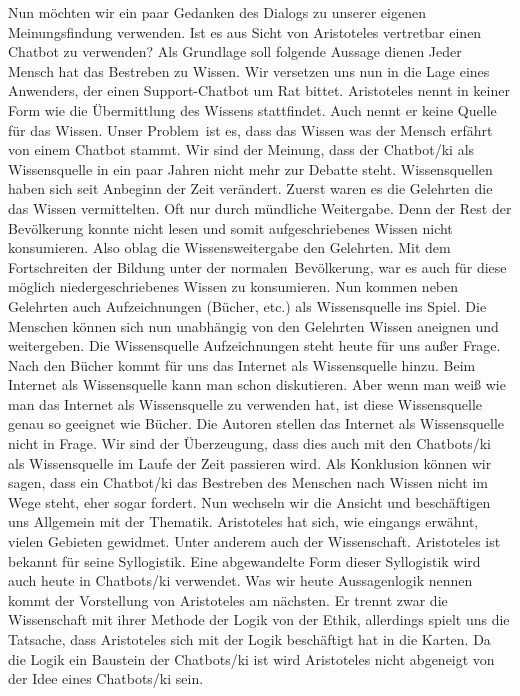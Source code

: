 Nun möchten wir ein paar Gedanken des Dialogs zu unserer eigenen Meinungsfindung verwenden. Ist es aus Sicht von Aristoteles vertretbar einen Chatbot zu verwenden? Als Grundlage soll folgende Aussage dienen \glqq Jeder Mensch hat das Bestreben zu Wissen\grqq. Wir versetzen uns nun in die Lage eines Anwenders, der einen Support-Chatbot um Rat bittet. Aristoteles nennt in keiner Form wie die Übermittlung des Wissens stattfindet. Auch nennt er keine Quelle für das Wissen. Unser \glqq Problem\grqq\ ist es, dass das Wissen was der Mensch erfährt von einem Chatbot stammt. Wir sind der Meinung, dass der Chatbot/\ac{ki} als Wissensquelle in ein paar Jahren nicht mehr zur Debatte steht. Wissensquellen haben sich seit Anbeginn der Zeit verändert. Zuerst waren es die Gelehrten die das Wissen vermittelten. Oft nur durch mündliche Weitergabe. Denn der Rest der Bevölkerung konnte nicht lesen und somit aufgeschriebenes Wissen nicht konsumieren. Also oblag die Wissensweitergabe den Gelehrten. Mit dem Fortschreiten der Bildung unter der \glqq normalen\grqq\ Bevölkerung, war es auch für diese möglich niedergeschriebenes Wissen zu konsumieren. Nun kommen neben Gelehrten auch Aufzeichnungen (Bücher, etc.) als Wissensquelle ins Spiel. Die Menschen können sich nun unabhängig von den Gelehrten Wissen aneignen und weitergeben. Die Wissensquelle Aufzeichnungen steht heute für uns außer Frage. Nach den Bücher kommt für uns das Internet als Wissensquelle hinzu. Beim Internet als Wissensquelle kann man schon diskutieren. Aber wenn man weiß wie man das Internet als Wissensquelle zu verwenden hat, ist diese Wissensquelle genau so geeignet wie Bücher. Die Autoren stellen das Internet als Wissensquelle nicht in Frage. Wir sind der Überzeugung, dass dies auch mit den Chatbots/\ac{ki} als Wissensquelle im Laufe der Zeit passieren wird. Als Konklusion können wir sagen, dass ein Chatbot/\ac{ki} das Bestreben des Menschen nach Wissen nicht im Wege steht, eher sogar fordert. \newline
Nun wechseln wir die Ansicht und beschäftigen uns Allgemein mit der Thematik. Aristoteles hat sich, wie eingangs erwähnt, vielen Gebieten gewidmet. Unter anderem auch der Wissenschaft. Aristoteles ist bekannt für seine Syllogistik. Eine abgewandelte Form dieser Syllogistik wird auch heute in Chatbots/\ac{ki} verwendet. Was wir heute Aussagenlogik nennen kommt der Vorstellung von Aristoteles am nächsten. Er trennt zwar die Wissenschaft mit ihrer Methode der Logik von der Ethik, allerdings spielt uns die Tatsache, dass Aristoteles sich mit der Logik beschäftigt hat in die Karten. Da die Logik ein Baustein der Chatbots/\ac{ki} ist wird Aristoteles nicht abgeneigt von der Idee eines Chatbots/\ac{ki} sein. \newline
